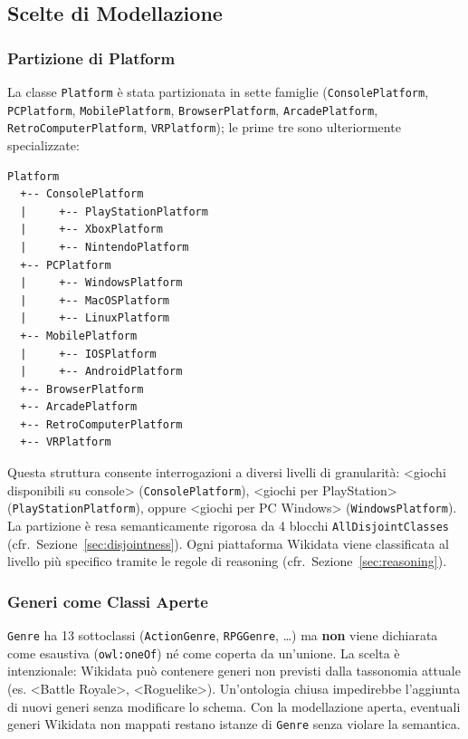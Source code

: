 \subsection{Scelte di Modellazione}

\subsubsection{Partizione di Platform}

\begingroup\sloppy
La classe \texttt{Platform} \`e stata partizionata in sette famiglie
(\texttt{ConsolePlatform}, \texttt{PCPlatform}, \texttt{MobilePlatform}, \texttt{BrowserPlatform},
\texttt{ArcadePlatform}, \texttt{RetroComputerPlatform}, \texttt{VRPlatform}); le prime tre
sono ulteriormente specializzate:\par\endgroup

\begin{verbatim}
Platform
  +-- ConsolePlatform
  |     +-- PlayStationPlatform
  |     +-- XboxPlatform
  |     +-- NintendoPlatform
  +-- PCPlatform
  |     +-- WindowsPlatform
  |     +-- MacOSPlatform
  |     +-- LinuxPlatform
  +-- MobilePlatform
  |     +-- IOSPlatform
  |     +-- AndroidPlatform
  +-- BrowserPlatform
  +-- ArcadePlatform
  +-- RetroComputerPlatform
  +-- VRPlatform
\end{verbatim}

Questa struttura consente interrogazioni a diversi livelli di granularit\`a:
\textless{}giochi disponibili su console\textgreater{} (\texttt{ConsolePlatform}),
\textless{}giochi per PlayStation\textgreater{} (\texttt{PlayStationPlatform}),
oppure \textless{}giochi per PC Windows\textgreater{} (\texttt{WindowsPlatform}).
La partizione \`e resa semanticamente rigorosa da 4 blocchi \texttt{AllDisjointClasses}
(cfr.~Sezione~\ref{sec:disjointness}). Ogni piattaforma Wikidata viene classificata
al livello pi\`u specifico tramite le regole di reasoning (cfr.~Sezione~\ref{sec:reasoning}).

\subsubsection{Generi come Classi Aperte}

\texttt{Genre} ha 13 sottoclassi (\texttt{ActionGenre}, \texttt{RPGGenre}, \dots{})
ma \textbf{non} viene dichiarata come esaustiva (\texttt{owl:oneOf}) n\'e come
coperta da un'unione. La scelta \`e intenzionale: Wikidata pu\`o contenere generi
non previsti dalla tassonomia attuale (es. \textless{}Battle Royale\textgreater{},
\textless{}Roguelike\textgreater{}). Un'ontologia chiusa impedirebbe l'aggiunta
di nuovi generi senza modificare lo schema. Con la modellazione aperta, eventuali
generi Wikidata non mappati restano istanze di \texttt{Genre} senza violare
la semantica.

